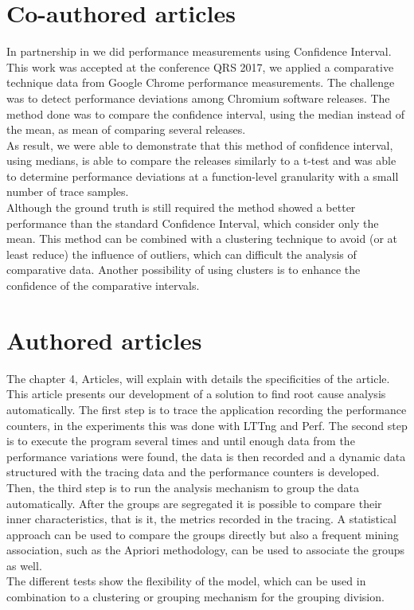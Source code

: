 \section{Co-authored articles}
In partnership in \cite{google_releases} we did performance measurements using Confidence Interval. This work was accepted at the conference QRS 2017, we applied a comparative technique data from Google Chrome performance measurements. The challenge was to detect performance deviations among Chromium software releases. The method done was to compare the confidence interval, using the median instead of the mean, as mean of comparing several releases.\\
As result, we were able to demonstrate that this method of confidence interval, using medians, is able to compare the releases similarly to a t-test and was able to determine performance deviations at a function-level granularity with a small number of trace samples.\\
Although the ground truth is still required the method showed a better performance than the standard Confidence Interval, which consider only the mean. 
This method can be combined with a clustering technique to avoid (or at least reduce) the influence of outliers, which can difficult the analysis of comparative data. Another possibility of using clusters is to enhance the confidence of the comparative intervals.
\section{Authored articles}
The chapter 4, Articles, will explain with details the specificities of the article. This article presents our development of a solution to find root cause analysis automatically. 
The first step is to trace the application recording the performance counters, in the experiments this was done with LTTng and Perf. The second step is to execute the program several times and until enough data from the performance variations were found, the data is then recorded and a dynamic data structured with the tracing data and the performance counters is developed. Then, the third step is to run the analysis mechanism to group the data automatically. After the groups are segregated it is possible to compare their inner characteristics, that is it, the metrics recorded in the tracing. A statistical approach can be used to compare the groups directly but also a frequent mining association, such as the Apriori methodology, can be used to associate the groups as well.\\
The different tests show the flexibility of the model, which can be used in combination to a clustering or grouping mechanism for the  grouping division.
